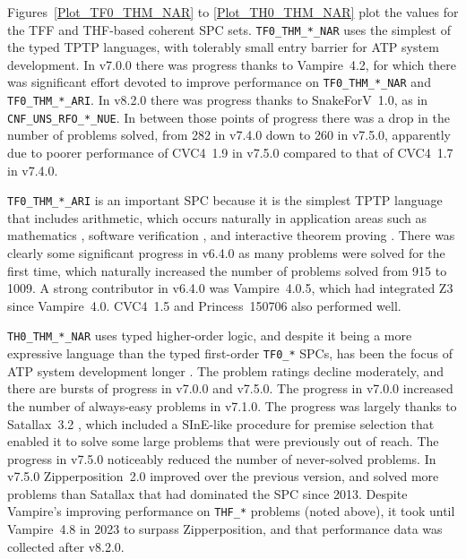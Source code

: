 \documentclass[runningheads]{llncs}
\begin{document}
Figures~\ref{Plot_TF0_THM_NAR} to \ref{Plot_TH0_THM_NAR} plot the values for the TFF and
THF-based coherent SPC sets.
{\tt TF0\_THM\_*\_NAR} uses the simplest of the typed TPTP languages, with tolerably small
entry barrier for ATP system development.
In v7.0.0 there was progress thanks to Vampire~4.2, for which there was significant effort
devoted to improve performance on {\tt TF0\_THM\_*\_NAR} and {\tt TF0\_THM\_*\_ARI}.
In v8.2.0 there was progress thanks to SnakeForV~1.0, as in {\tt CNF\_UNS\_RFO\_*\_NUE}.
In between those points of progress there was a drop in the number of problems solved, from
282 in v7.4.0 down to 260 in v7.5.0, apparently due to poorer performance of CVC4~1.9 \cite{BC+11}
in v7.5.0 compared to that of CVC4~1.7 in v7.4.0.

{\tt TF0\_THM\_*\_ARI} is an important SPC because it is the simplest TPTP language that 
includes arithmetic, which occurs naturally in application areas such as mathematics \cite{KK+23}, 
software verification \cite{BF+15}, and interactive theorem proving \cite{PB10}.
There was clearly some significant progress in v6.4.0 as many problems were solved for the
first time, which naturally increased the number of problems solved from 915 to 1009.
A strong contributor in v6.4.0 was Vampire~4.0.5, which had integrated Z3 \cite{dMB08} since 
Vampire~4.0.
CVC4~1.5 \cite{BC+11} and Princess~150706 \cite{Rue08} also performed well.

{\tt TH0\_THM\_*\_NAR} uses typed higher-order logic, and despite it being a more expressive
language than the typed first-order {\tt TF0\_*} SPCs, has been the focus of ATP system development
longer \cite{SB10,SS+12}.
The problem ratings decline moderately, and there are bursts of progress in v7.0.0 and v7.5.0.
The progress in v7.0.0 increased the number of always-easy problems in v7.1.0.
The progress was largely thanks to Satallax~3.2 \cite{Bro12}, which included a SInE-like 
\cite{HV11} procedure for premise selection that enabled it to solve some large problems that 
were previously out of reach. 
The progress in v7.5.0 noticeably reduced the number of never-solved problems.
In v7.5.0 Zipperposition~2.0 \cite{BB+19-CADE} improved over the previous version, and solved
more problems than Satallax that had dominated the SPC since 2013.
Despite Vampire's improving performance on {\tt THF\_*} problems (noted above), it took until
Vampire~4.8 in 2023 to surpass Zipperposition, and that performance data was collected after v8.2.0.
\end{document}
